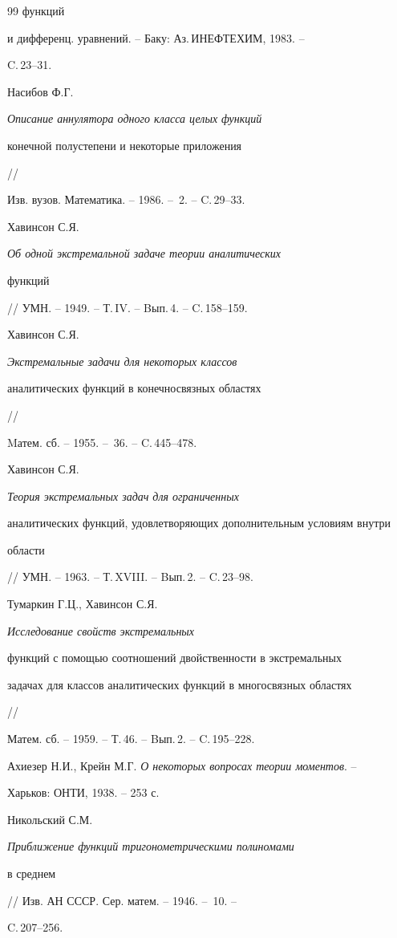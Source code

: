 \begin{thebibliography}{99}
функций 


и дифференц. уравнений. -- Баку: Аз.\,ИНЕФТЕХИМ, 1983. -- 


C.\,23--31. 




Насибов Ф.Г. {\em Описание аннулятора одного класса целых функций 


конечной полустепени и некоторые приложения} // 


Изв. вузов. Математика. -- 1986. -- \No\,2. -- C.\,29--33. 




Хавинсон С.Я. {\em Об одной экстремальной задаче теории аналитических 


функций} // УМН. -- 1949. -- Т.\,IV. -- Bып.\,4. -- C.\,158--159. 




Хавинсон С.Я. {\em Экстремальные задачи для некоторых классов 


аналитических функций в конечносвязных областях} // 


Mатем. сб. -- 1955. -- \No\,36. -- C.\,445--478. 




Хавинсон С.Я. {\em Теория экстремальных задач для ограниченных 


аналитических функций, удовлетворяющих дополнительным условиям внутри 


области} // УМН. -- 1963. -- Т.\,XVIII. -- Bып.\,2. -- C.\,23--98. 




Тумаркин Г.Ц., Хавинсон С.Я. {\em Исследование свойств экстремальных 


функций с помощью соотношений двойственности в экстремальных 


задачах для классов аналитических функций в многосвязных областях} // 


Матем. сб. -- 1959. -- Т.\,46. -- Bып.\,2. -- C.\,195--228. 




Ахиезер Н.И., Крейн М.Г. {\em О некоторых вопросах теории моментов}. -- 


Харьков: ОНТИ, 1938. -- 253 с. 




Никольский С.М. {\em Приближение функций тригонометрическими полиномами 


в среднем} // Изв. АН СССР. Сер. матем. -- 1946. -- \No\,10. -- 


C.\,207--256. 



\end{thebibliography}
